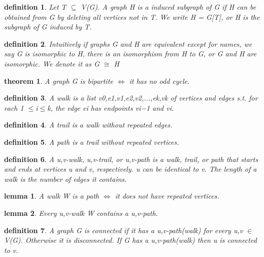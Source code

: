 \documentclass[twocolumn][2pt]{article}
\newtheorem{theorem}{theorem}[section]  %
\newtheorem{definition}{definition}
\newtheorem{lemma}{lemma}
\begin{document}
\begin{CJK*}{UTF8}{bkai}
    \begin{definition}
        Let T $\subseteq$ V(G). A graph H is a induced subgraph of G if H can be obtained
 from G by deleting all vertices not in T. We write H = G[T], or H is the
 subgraph of G induced by T.       
    \end{definition}

    \begin{definition}
         Intuitively if graphs G and H are equivalent except for names, we say G is
 isomorphic to H, there is an isomorphism from H to G, or G and H are
 isomorphic. We denote it as G $\cong$ H
    \end{definition}

    \begin{theorem}
        A graph G is bipartite $\iff$ it has no odd cycle.
    \end{theorem}

    \begin{definition}
        A walk is a list v0,e1,v1,e2,v2,...,ek,vk of vertices and edges s.t. for each
 1 $\leq$i$\leq$k, the edge ei has endpoints vi−1 and vi.
    \end{definition}

    \begin{definition}
        A trail is a walk without repeated edges.
    \end{definition}

    \begin{definition}
         A path is a trail without repeated vertices.
    \end{definition}

    \begin{definition}
         A u,v-walk, u,v-trail, or u,v-path is a walk, trail, or path that starts and ends
 at vertices u and v, respectively. u can be identical to v. The length of a walk
 is the number of edges it contains.
    \end{definition}

    \begin{lemma}
        A walk W is a path $\iff$ it does not have repeated vertices.
    \end{lemma}


    \begin{lemma}
        Every u,v-walk W contains a u,v-path.
    \end{lemma}

    \begin{definition}
         A graph G is connected if it has a u,v-path(walk) for every u,v $\in$ V(G).
 Otherwise it is disconnected. If G has a u,v-path(walk) then u is connected to
 v.
    \end{definition}


\end{CJK*}
\end{document}
